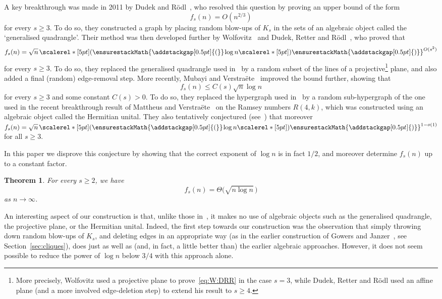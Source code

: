 \documentclass[12pt,reqno]{amsart}
\newcommand\pig[1]{\scalerel*[5pt]{\normalsize#1}{%
  \ensurestackMath{\addstackgap[0.5pt]{\normalsize#1}}}}
\newcommand\pigl[1]{\hspace{0.05cm}\mathopen{\pig{#1}}\hspace{0.03cm}}
\newtheorem{theorem}{Theorem}
\theoremstyle{remark}
\numberwithin{theorem}{section}
\renewcommand{\(}{\bigl(}
\renewcommand{\)}{\bigr)\vphantom{)}}
\renewcommand{\le}{\leqslant}
\renewcommand{\ge}{\geqslant}
\newcommand{\N}{\mathbb N}
\begin{document}
A key breakthrough was made in 2011 by Dudek and R\"odl~\cite{DR11}, who resolved this question by proving an upper bound of the form
$$f_s(n) = O(n^{2/3})$$
for every $s \ge 3$. To do so, they constructed a graph by placing random blow-ups of $K_s$ in the sets of an algebraic object called the `generalised quadrangle'. Their method was then developed further by Wolfovitz~\cite{W13} and Dudek, Retter and R\"odl~\cite{DRR14}, who proved that 
\begin{equation}\label{eq:W:DRR}
f_{s}(n) = \sqrt{n} \pigl( \log n \pig)^{O(s^2)}
\end{equation}
for every $s \ge 3$. To do so, they replaced the generalised quadrangle used in~\cite{DR11} by a random subset of the lines of a projective\footnote{More precisely, Wolfovitz used a projective plane to prove~\eqref{eq:W:DRR} in the case $s = 3$, while Dudek, Retter and R\"odl used an affine plane (and a more involved edge-deletion step) to extend his result to $s \ge 4$.} plane, and also added a final (random) edge-removal step. More recently, Mubayi and Verstra\"ete~\cite{MV25} improved the bound further, showing that  
$$f_{s}(n) \le C(s) \sqrt{n} \log n$$
for every $s \ge 3$ and some constant $C(s) > 0$. To do so, they replaced the hypergraph used in~\cite{DRR14} by a random sub-hypergraph of the one used in the recent breakthrough result of Mattheus and Verstra\"ete~\cite{MaV} on the Ramsey numbers $R(4,k)$, which was constructed using an algebraic object called the Hermitian unital. They also tentatively conjectured (see~\cite[Conjecture~1]{MV25}) that moreover $f_{s}(n) = \sqrt{n} \pigl( \log n \pig)^{1-o(1)}$ for all $s \ge 3$. 

In this paper we disprove this conjecture by showing that the correct exponent of $\log n$ is in fact $1/2$, and moreover determine $f_s(n)$ up to a constant factor. %

\begin{theorem}\label{thm:ER} 
For every $s \ge 2$, we have 
\begin{equation}\label{eq:mainthm}
f_s(n) = \Theta\big( \sqrt{n \log n} \, \big) 
\end{equation}
as $n \to \infty$. %
\end{theorem}

An interesting aspect of our construction is that, unlike those in~\cite{DR11,W13,DRR14,MV25}, it makes no use of algebraic objects such as the generalised quadrangle, the projective plane, or the Hermitian unital.
Indeed, the first step towards our construction was the observation that simply throwing down random blow-ups of $K_s$, 
and deleting edges in an appropriate way (as in the earlier construction of Gowers and Janzer~\cite{GJ20}, see Section~\ref{sec:cliques}), does just as well as (and, in fact, a little better than) the earlier algebraic approaches. However, it does not seem possible to reduce the power of $\log n$ below $3/4$ with this approach alone. 
\end{document}
